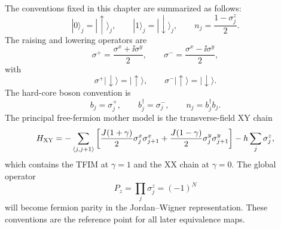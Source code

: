The conventions fixed in this chapter are summarized as follows:
\begin{equation}
    |0\rangle_j=|\uparrow\rangle_j,
    \qquad
    |1\rangle_j=|\downarrow\rangle_j,
    \qquad
    n_j=\frac{1-\sigma_j^z}{2}.
\end{equation}
The raising and lowering operators are
\begin{equation}
    \sigma^+=\frac{\sigma^x+\ii\sigma^y}{2},
    \qquad
    \sigma^-=\frac{\sigma^x-\ii\sigma^y}{2},
\end{equation}
with
\begin{equation}
    \sigma^+|\downarrow\rangle=|\uparrow\rangle,
    \qquad
    \sigma^-|\uparrow\rangle=|\downarrow\rangle.
\end{equation}
The hard-core boson convention is
\begin{equation}
    b_j=\sigma_j^+,
    \qquad
    b_j^\dagger=\sigma_j^-,
    \qquad
    n_j=b_j^\dagger b_j.
\end{equation}
The principal free-fermion mother model is the transverse-field XY chain
\begin{equation}
    H_{\rm XY}
    =
    -\sum_{\langle j,j+1\rangle}
    \left[
        \frac{J(1+\gamma)}{2}\sigma_j^x\sigma_{j+1}^x
        +
        \frac{J(1-\gamma)}{2}\sigma_j^y\sigma_{j+1}^y
    \right]
    -h\sum_j\sigma_j^z,
\end{equation}
which contains the TFIM at $\gamma=1$ and the XX chain at $\gamma=0$. The global
operator
\begin{equation}
    P_z=\prod_j\sigma_j^z=(-1)^N
\end{equation}
will become fermion parity in the Jordan--Wigner representation. These conventions
are the reference point for all later equivalence maps.
